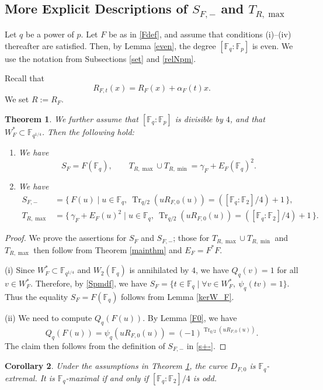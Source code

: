 \documentclass[12pt,a4paper]{amsart}
\newtheorem{theorem}{Theorem}[section]
\newtheorem{corollary}[theorem]{Corollary}
\theoremstyle{definition}
\def\F{{\mathbb F}}
\theoremstyle{remark}
\DeclareMathOperator{\Tr}{Tr}
\begin{document}
\subsection{More Explicit Descriptions of $S_{F,-}$ and $T_{R,\max}$}\label{MEDST}
Let $q$ be a power of $p$. 
Let $F$ be as in \eqref{Fdef}, and assume that conditions (i)--(iv) thereafter are satisfied. 
Then, by Lemma \ref{even}, the degree $[\F_q:\F_p]$ is even. 
We use the notation from Subsections \ref{set} and \ref{relNpm}. 


Recall that 
\[
R_{F,t}(x)=R_F(x)+\alpha_F(t)x. 
\]
We set $R:=R_F$. 
\begin{theorem}\label{easycase}
We further assume that $[\F_q:\F_p]$ is divisible by $4$, and that $W_F^\ast\subset \F_{q^{1/4}}$. Then the following hold: 
\begin{enumerate}
\item We have 
\[S_F=F(\F_q),\qquad T_{R,\max} \cup T_{R,\min}=\gamma_F+E_F(\F_q)^2. 
\]
\item We have 
\begin{align*}
S_{F,-}&=\{\,F(u)\mid u\in \F_q,\ \Tr_{q/2}(uR_{F,0}(u))=([\F_q:\F_2]/4)+1\,\}, \\
T_{R,\max}&=\{\,\gamma_F+E_F(u)^2\mid u\in \F_q,\ \Tr_{q/2}(uR_{F,0}(u))=([\F_q:\F_2]/4)+1\, \}. 
\end{align*}
\end{enumerate}
\end{theorem}
\begin{proof}
We prove the assertions for $S_F$ and $S_{F,-}$; those for $T_{R,\max} \cup T_{R,\min}$ and $T_{R,\max}$ then follow from Theorem \ref{mainthm} and $E_F=F^\ast F$. 

(i) Since $W_F^\ast\subset \F_{q^{1/4}}$ and 
$W_2(\F_q)$ is annihilated by $4$, we have $Q_q(v)=1$ for all $v\in W_F^\ast$. Therefore, by \eqref{Spmdf}, we have 
$S_F=\{t \in \F_q \mid \forall v \in W_F^\ast,\ \psi_q(tv)=1\}$. 
Thus the equality $S_F=F(\F_q)$ follows from Lemma \ref{kerW_F}. 

(ii) We need to compute $Q_q(F(u))$. By Lemma \ref{F0}, we have 
\[
Q_q(F(u))=\psi_q(uR_{F,0}(u))=(-1)^{\Tr_{q/2}(uR_{F,0}(u))}. 
\]
 The claim then follows from the definition of $S_{F,-}$ in \eqref{s+-}. 
\end{proof}
\begin{corollary}
    Under the assumptions in Theorem \ref{easycase}, the curve $D_{F,0}$ is $\F_q$-extremal. It is $\F_q$-maximal if and only if $[\F_q:\F_2]/4$ is odd. 
\end{corollary}
 
\end{document}
